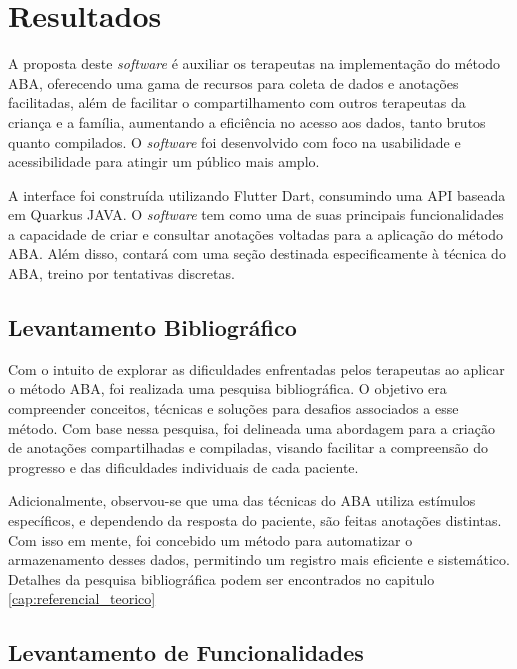 
\chapter{Resultados}\label{cap:resultados}

A proposta deste \textit{software} é auxiliar os terapeutas na implementação do método ABA, 
oferecendo uma gama de recursos para coleta de dados e anotações facilitadas, além de facilitar 
o compartilhamento com outros terapeutas da criança e a família, aumentando a eficiência no 
acesso aos dados, tanto brutos quanto compilados. O \textit{software} foi desenvolvido com foco na 
usabilidade e acessibilidade para atingir um público mais amplo.

A interface foi construída utilizando Flutter Dart, consumindo uma API baseada em Quarkus JAVA. 
O \textit{software} tem como uma de suas principais funcionalidades a capacidade de criar e 
consultar anotações voltadas para a aplicação do método ABA. Além disso, contará com uma seção 
destinada especificamente à técnica do ABA, treino por tentativas discretas.

\section{Levantamento Bibliográfico}

Com o intuito de explorar as dificuldades enfrentadas pelos terapeutas ao aplicar o método ABA, 
foi realizada uma pesquisa bibliográfica. O objetivo era compreender conceitos, 
técnicas e soluções para desafios associados a esse método. Com base nessa pesquisa, 
foi delineada uma abordagem para a criação de anotações compartilhadas e compiladas, 
visando facilitar a compreensão do progresso e das dificuldades individuais de cada paciente.

Adicionalmente, observou-se que uma das técnicas do ABA utiliza estímulos específicos, e 
dependendo da resposta do paciente, são feitas anotações distintas. Com isso em mente, 
foi concebido um método para automatizar o armazenamento desses dados, permitindo um registro 
mais eficiente e sistemático. Detalhes da pesquisa bibliográfica podem ser encontrados no 
capitulo \ref{cap:referencial_teorico}

\section{Levantamento de Funcionalidades}

